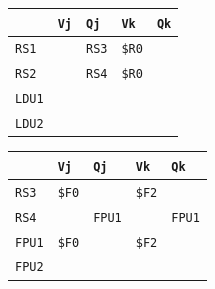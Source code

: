 \begin{enumerate}
    \begin{minipage}{0.45\textwidth}
        \centering
        \begin{tabular}{@{} l | l l l l @{}}
            \toprule
                & \texttt{Vj} & \texttt{Qj} & \texttt{Vk} & \texttt{Qk} \\
            \midrule
            \texttt{RS1} & & \texttt{RS3} & \texttt{\$R0} & \\ [.3em]
            \texttt{RS2} & & \texttt{RS4} & \texttt{\$R0} & \\
            \cmidrule{1-5}
            \texttt{LDU1} & & & & \\ [.3em]
            \texttt{LDU2} & & & & \\
            \bottomrule
        \end{tabular}
    \end{minipage}
    \hfill
    \begin{minipage}{0.45\textwidth}
        \centering
        \begin{tabular}{@{} l | l l l l @{}}
            \toprule
            & \texttt{Vj} & \texttt{Qj} & \texttt{Vk} & \texttt{Qk} \\
            \midrule
            \texttt{RS3} & \texttt{\$F0} & & \texttt{\$F2} & \\ [.3em]
            \texttt{RS4} & & \texttt{FPU1} & & \texttt{FPU1} \\
            \cmidrule{1-5}
            \texttt{FPU1} & \texttt{\$F0} & & \texttt{\$F2} & \\ [.3em]
            \texttt{FPU2} & & & & \\
            \bottomrule
        \end{tabular}
    \end{minipage}


\end{enumerate}

